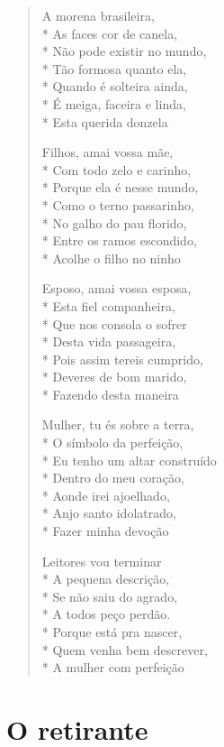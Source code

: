 \begin{verse}
A morena brasileira,\\*
As faces cor de canela,\\*
Não pode existir no mundo,\\*
Tão formosa quanto ela,\\*
Quando é solteira ainda,\\*
É meiga, faceira e linda,\\*
Esta querida donzela

Filhos, amai vossa mãe,\\*
Com todo zelo e carinho,\\*
Porque ela é nesse mundo,\\*
Como o terno passarinho,\\*
No galho do pau florido,\\*
Entre os ramos escondido,\\*
Acolhe o filho no ninho

Esposo, amai vossa esposa,\\*
Esta fiel companheira,\\*
Que nos consola o sofrer\\*
Desta vida passageira,\\*
Pois assim tereis cumprido,\\*
Deveres de bom marido,\\*
Fazendo desta maneira

Mulher, tu és sobre a terra,\\*
O símbolo da perfeição,\\*
Eu tenho um altar construído\\*
Dentro do meu coração,\\*
Aonde irei ajoelhado,\\*
Anjo santo idolatrado,\\*
Fazer minha devoção

Leitores vou terminar\\*
A pequena descrição,\\*
Se não saiu do agrado,\\*
A todos peço perdão.\\*
Porque está pra nascer,\\*
Quem venha bem descrever,\\*
A mulher com perfeição

\end{verse}

\chapter{O retirante}

